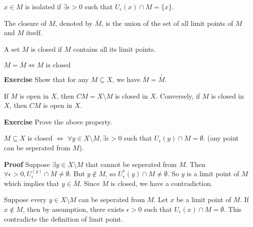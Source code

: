 \documentclass[main.tex]{subfiles}
\begin{document}
\begin{definition}
    $x\in M$ is isolated if $\exists \epsilon > 0$ such that $U_{\epsilon} (x) \cap M = \{x\}$.
\end{definition}

\begin{definition}
    The closure of $M$, denoted by $\overline{M}$, is the union of the set of all limit points of $M$ and $M$ itself.
\end{definition}
\begin{definition}
    A set $M$ is closed if $M$ contains all its limit points. 
\end{definition}
\begin{property}
    $M = \overline{M} \Longleftrightarrow M \text{ is closed}$
\end{property}
\par \noindent \textbf{Exercise} Show that for any $M \subseteq X$, we have $\overline{M} = \overline{\overline{M}}$. 
\begin{property}
    If $M$ is open in $X$, then $CM = X \setminus M$ is closed in $X$. Conversely, if $M$ is closed in $X$, then $CM$ is open in $X$.
\end{property}
\par \noindent \textbf{Exercise} Prove the above property. 

\begin{property}
    $M \subseteq X$ is closed $\Longleftrightarrow$ $\forall y\in X\setminus M, \exists \epsilon > 0$ such that $U_{\epsilon} (y) \cap M = \emptyset$. (any point can be seperated from $M$). 
\end{property}
\par \noindent \textbf{Proof} Suppose $\exists y \in X\setminus M$ that cannot be seperated from $M$. Then $\forall \epsilon > 0, U_{\epsilon} ^(y) \cap M \neq \emptyset$. But $y\notin M$, so $U_{\epsilon}^{\ast} (y) \cap M \neq \emptyset$. So $y$ is a limit point of $M$ which implies that $y\in \overline{M}$. Since $M$ is closed, we have a contradiction. 
\par Suppose every $y\in X\setminus M$ can be seperated from $M$. Let $x$ be a limit point of $M$. If $x \notin M$, then by assumption, there exists $\epsilon > 0$ such that $U_{\epsilon} (x) \cap M = \emptyset$. This contradicts the definition of limit point. 
\end{document}

